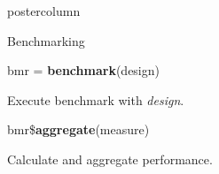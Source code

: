 \documentclass{beamer}
\begin{document}
\begin{frame}[fragile]{}
\begin{columns}
\begin{column}{.245\textwidth}
\begin{beamercolorbox}[center]{postercolumn}
\begin{minipage}{.98\textwidth}
{\begin{myblock}{Benchmarking}
						      \\
						      \begin{codebox}
							      bmr = \textbf{benchmark}(design)
						      \end{codebox}
						      \hspace*{1ex}Execute benchmark with \textit{design}.
					      	\\
						      \begin{codebox}
							      bmr\$\textbf{aggregate}(measure)
						      \end{codebox}
						      \hspace*{1ex}Calculate and aggregate performance.
					        \end{myblock}\vfill
				            }
		          	\end{minipage}
		          \end{beamercolorbox}
	           \end{column}
            \end{columns}
          \end{frame}
        
\end{document}
